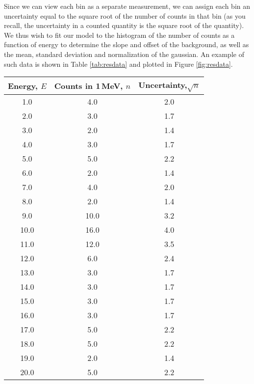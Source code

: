 Since we can view each bin as a separate measurement, we can assign each bin an uncertainty equal to the square root of the number of counts in that bin (as you recall, the uncertainty in a counted quantity is the square root of the quantity). We thus wish to fit our model to the histogram of the number of counts as a function of energy to determine the slope and offset of the background, as well as the mean, standard deviation and normalization of the gaussian. An example of such data is shown in Table \ref{tab:resdata} and plotted in Figure \ref{fig:resdata}.

\begin{center}
\begin{tabular}{|c|c|c|}
\hline
\textbf{Energy, $E$}&\textbf{Counts in 1\,MeV, $n$}&\textbf{Uncertainty,$\sqrt{n}$}\\
\hline
1.0 & 4.0 & 2.0\\
\hline
2.0 & 3.0 & 1.7\\
\hline
3.0 & 2.0 & 1.4\\
\hline
4.0 & 3.0 & 1.7\\
\hline
5.0 & 5.0 & 2.2\\
\hline
6.0 & 2.0 & 1.4\\
\hline
7.0 & 4.0 & 2.0\\
\hline
8.0 & 2.0 & 1.4\\
\hline
9.0 & 10.0 & 3.2\\
\hline
10.0 & 16.0 & 4.0\\
\hline
11.0 & 12.0 & 3.5\\
\hline
12.0 & 6.0 & 2.4\\
\hline
13.0 & 3.0 & 1.7\\
\hline
14.0 & 3.0 & 1.7\\
\hline
15.0 & 3.0 & 1.7\\
\hline
16.0 & 3.0 & 1.7\\
\hline
17.0 & 5.0 & 2.2\\
\hline
18.0 & 5.0 & 2.2\\
\hline
19.0 & 2.0 & 1.4\\
\hline
20.0 & 5.0 & 2.2\\
\hline
\end{tabular}
\end{center}



